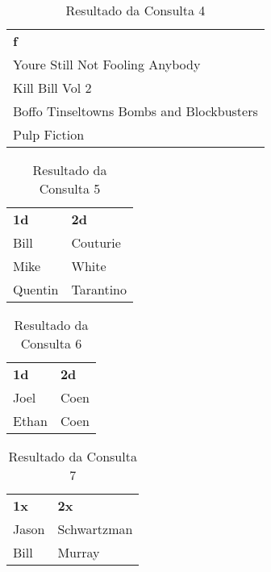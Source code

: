 \documentclass{article}
\begin{document}
\begin{table}[htbp]
\begin{center}
\begin{tabular}{l}

\textbf{f} \\ 
Youre Still Not Fooling Anybody \\ 
Kill Bill Vol 2 \\ 
Boffo Tinseltowns Bombs and Blockbusters \\ 
Pulp Fiction \\ 
\end{tabular}
\end{center}
\caption{Resultado da Consulta 4}
\label{}
\end{table}

\begin{table}[htbp]
\begin{center}
\begin{tabular}{ll}

\textbf{1d} & \textbf{2d} \\ 
Bill & Couturie \\ 
Mike & White \\ 
Quentin & Tarantino \\ 
\end{tabular}
\end{center}
\caption{Resultado da Consulta 5}
\label{}
\end{table}

\begin{table}[htbp]
\begin{center}
\begin{tabular}{ll}

\textbf{1d} & \textbf{2d} \\ 
Joel & Coen \\ 
Ethan & Coen   \\ 
\end{tabular}
\end{center}
\caption{Resultado da Consulta 6}
\label{}
\end{table}

\begin{table}[htbp]
\begin{center}
\begin{tabular}{ll}

\textbf{1x} & \textbf{2x} \\ 
Jason & Schwartzman \\ 
Bill & Murray  \\ 
\end{tabular}
\end{center}
\caption{Resultado da Consulta 7}
\label{}
\end{table}
\end{document}
